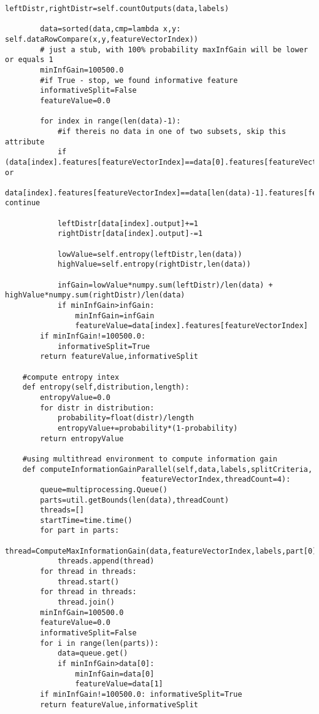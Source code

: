 \begin{lstlisting}[style=python,caption=Classification tree]
        leftDistr,rightDistr=self.countOutputs(data,labels)
        
        data=sorted(data,cmp=lambda x,y: self.dataRowCompare(x,y,featureVectorIndex))        
        # just a stub, with 100% probability maxInfGain will be lower or equals 1
        minInfGain=100500.0
        #if True - stop, we found informative feature
        informativeSplit=False
        featureValue=0.0
        
        for index in range(len(data)-1):
        	#if thereis no data in one of two subsets, skip this attribute
            if (data[index].features[featureVectorIndex]==data[0].features[featureVectorIndex] or
                data[index].features[featureVectorIndex]==data[len(data)-1].features[featureVectorIndex]): continue
                       
            leftDistr[data[index].output]+=1
            rightDistr[data[index].output]-=1
            
            lowValue=self.entropy(leftDistr,len(data))
            highValue=self.entropy(rightDistr,len(data))
            
            infGain=lowValue*numpy.sum(leftDistr)/len(data) + highValue*numpy.sum(rightDistr)/len(data)
            if minInfGain>infGain:
                minInfGain=infGain
                featureValue=data[index].features[featureVectorIndex]
        if minInfGain!=100500.0:
            informativeSplit=True
        return featureValue,informativeSplit
            
	#compute entropy intex
    def entropy(self,distribution,length):
        entropyValue=0.0
        for distr in distribution:
            probability=float(distr)/length
            entropyValue+=probability*(1-probability)
        return entropyValue

    #using multithread environment to compute information gain
    def computeInformationGainParallel(self,data,labels,splitCriteria,
                               featureVectorIndex,threadCount=4):
        queue=multiprocessing.Queue()
        parts=util.getBounds(len(data),threadCount)
        threads=[]
        startTime=time.time()
        for part in parts:
            thread=ComputeMaxInformationGain(data,featureVectorIndex,labels,part[0],part[1],queue,splitCriteria)
            threads.append(thread)
        for thread in threads:
            thread.start()
        for thread in threads:
            thread.join()
        minInfGain=100500.0
        featureValue=0.0
        informativeSplit=False
        for i in range(len(parts)):
            data=queue.get()
            if minInfGain>data[0]:
                minInfGain=data[0]
                featureValue=data[1]
        if minInfGain!=100500.0: informativeSplit=True
        return featureValue,informativeSplit
            

\end{lstlisting}
